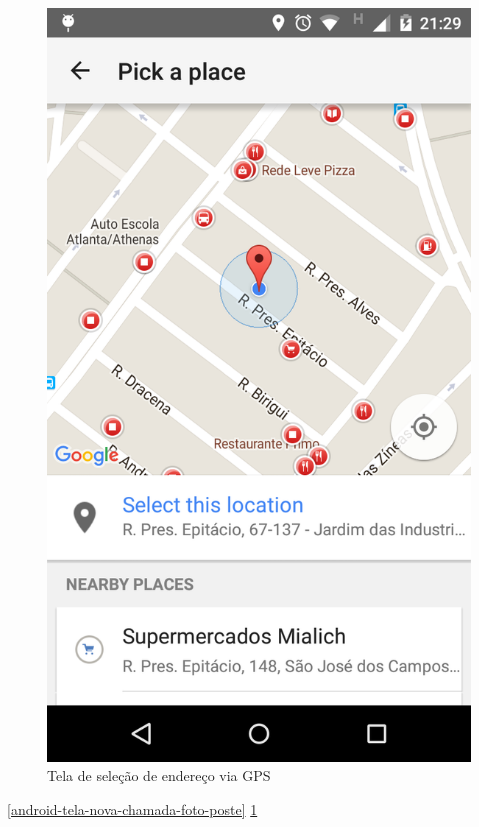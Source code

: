 \documentclass[
	article,			%
	11pt,				%
	oneside,			%
	a4paper,			%
	english,			%
	brazil,				%
	sumario=tradicional
	]{abntex2}
\begin{document}
\begin{figure}[!htbp]
\begin{minipage}{0.4\textwidth}
    \caption{\label{android-tela-gps}Tela de seleção de endereço via GPS}
    \includegraphics[scale=0.1]{android/4.png}
  \end{minipage}
\end{figure}

\ref{android-tela-nova-chamada-foto-poste} \ref{android-tela-gps}
\end{document}
